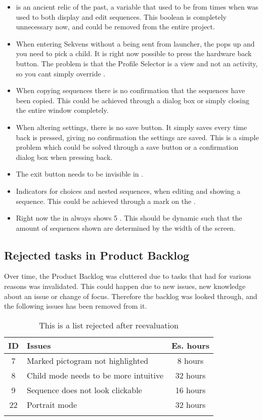 \begin{itemize}
\item {} is an ancient relic of the past, a variable that used to be from times when  was used to both display and edit sequences. This boolean is completely unnecessary now, and could be removed from the entire project.
\item When entering Sekvens without a  being sent from launcher, the  pops up and you need to pick a child. It is right now possible to press the hardware back button. The problem is that the Profile Selector is a view and not an activity, so you cant simply override .
\item When copying sequences there is no confirmation that the sequences have been copied. This could be achieved through a dialog box or simply closing the entire window completely.
\item When altering settings, there is no save button. It simply saves every time back is pressed, giving no confirmation the settings are saved. This is a simple problem which could be solved through a save button or a confirmation dialog box when pressing back.
\item The exit button needs to be invisible in . 
\item Indicators for choices and nested sequences, when editing and showing a sequence. This could be achieved through a mark on the .
\item Right now the  in  always shows 5 . This should be dynamic such that the amount of sequences shown are determined by the width of the screen.
\end{itemize}

\subsection{Rejected tasks in Product Backlog}
Over time, the Product Backlog was cluttered due to tasks that had for various reasons was invalidated. This could happen due to new issues, new knowledge about an issue or change of focus. Therefore the backlog was looked through, and the following issues has been removed from it.

\begin{longtable} { | c | p{12cm} | c | } 
\hline
	ID 	&	Issues	&	 Es. hours \\\hline
	7	& 	Marked pictogram not highlighted		& 	8 hours  \\\hline
	8	& 	Child mode needs to be more intuitive		& 	32 hours  \\\hline
	9	& 	Sequence does not look clickable 	& 	16 hours  \\\hline
	22	& 	Portrait mode	& 	32 hours  \\\hline
\caption{This is a list rejected after reevaluation}
\label{tab:spr4_sw_prodblog}
\end{longtable}


